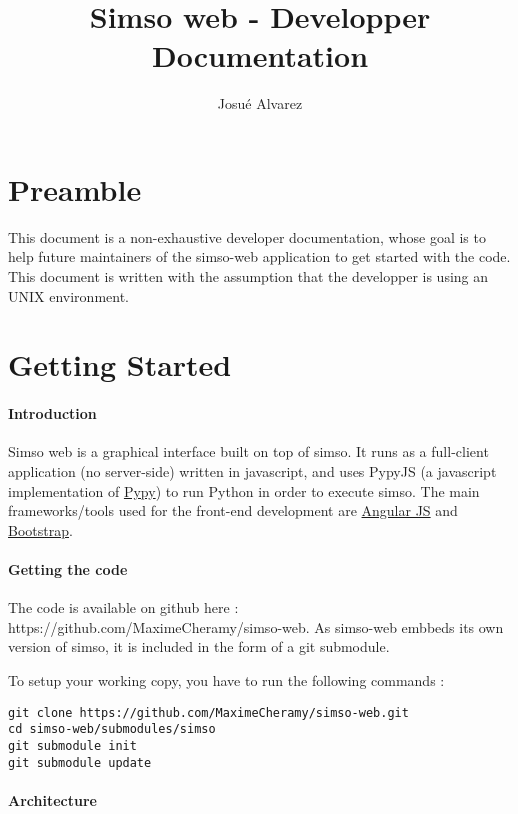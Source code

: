 \documentclass[10pt,a4paper]{article}
\author{Josué Alvarez}
\title{Simso web - Developper Documentation}
\begin{document}
\maketitle
\newpage
\section{Preamble}
This document is a non-exhaustive developer documentation, whose goal is to help future maintainers of the simso-web application to get started with the code. 
This document is written with the assumption that the developper is using an UNIX environment.

\section{Getting Started}
\paragraph{Introduction}
Simso web is a graphical interface built on top of simso. It runs as a full-client application (no server-side) written in javascript, and uses PypyJS (a javascript implementation of \href{"http://www.pypy.org/"}{Pypy}) to run Python in order to execute simso.
The main frameworks/tools used for the front-end development are \href{"https://angularjs.org/"}{Angular JS} and \href{"http://getbootstrap.com/"}{Bootstrap}.

\paragraph{Getting the code}
The code is available on github here : https://github.com/MaximeCheramy/simso-web. 
As simso-web embbeds its own version of simso, it is included in the form of a git submodule.

To setup your working copy, you have to run the following commands :
\begin{lstlisting}
git clone https://github.com/MaximeCheramy/simso-web.git
cd simso-web/submodules/simso
git submodule init
git submodule update
\end{lstlisting}

\paragraph{Architecture}
\end{document}
